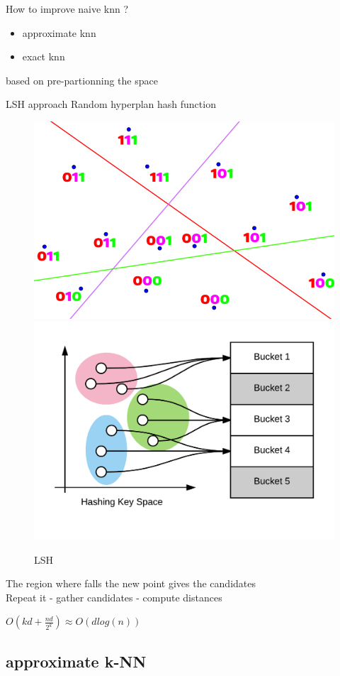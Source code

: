 \documentclass[11 pt]{beamer}
\begin{document}
\begin{frame}{How to improve naive knn ?}
\begin{itemize}
	\item approximate knn
	\item exact knn
\end{itemize}

\textrightarrow based on pre-partionning the space
\end{frame}
%

\begin{frame}{LSH approach}
Random hyperplan \textrightarrow hash function
\begin{figure}
	\centering
	\includegraphics[width=.45\textwidth]{figures/lsh.png}
	\includegraphics[width=.45\textwidth]{figures/lsh2.png}
	\caption{LSH}
	\label{fig:lsh2}
\end{figure}

The region where falls the new point gives the candidates
\\
Repeat it - gather candidates - compute distances

$O(kd + \frac{nd}{2^k})\approx O(dlog(n))$


\end{frame}
\subsection{approximate k-NN}
\end{document}
